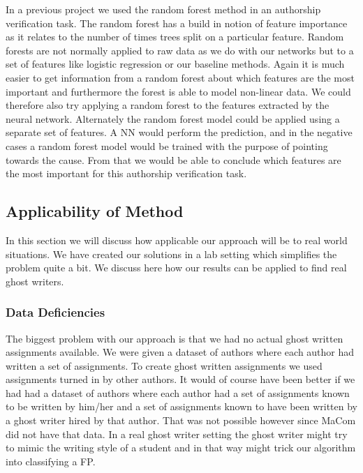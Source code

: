 In a previous project \citep{US} we used the random forest method in an
authorship verification task. The random forest has a build in notion of feature
importance as it relates to the number of times trees split on a particular
feature. Random forests are not normally applied to raw data as we do with our
networks but to a set of features like logistic regression or our baseline
methods. Again it is much easier to get information from a random forest about
which features are the most important and furthermore the forest is able to
model non-linear data. We could therefore also try applying a random forest to
the features extracted by the neural network. Alternately the random forest
model could be applied using a separate set of features. A \gls{NN} would
perform the prediction, and in the negative cases a random forest model would
be trained with the purpose of pointing towards the cause. From that we would
be able to conclude which features are the most important for this authorship
verification task.


\subsection{Applicability of Method}\label{subsec:applicability_of_method}

In this section we will discuss how applicable our approach will be to real
world situations. We have created our solutions in a lab setting which
simplifies the problem quite a bit. We discuss here how our results can be
applied to find real ghost writers.


\subsubsection{Data Deficiencies}

The biggest problem with our approach is that we had no actual ghost written
assignments available. We were given a dataset of authors where each author
had written a set of assignments. To create ghost written assignments we used
assignments turned in by other authors. It would of course have been better if
we had had a dataset of authors where each author had a set of assignments known
to be written by him/her and a set of assignments known to have been written by
a ghost writer hired by that author. That was not possible however since MaCom
did not have that data. In a real ghost writer setting the ghost writer might
try to mimic the writing style of a student and in that way might trick our
algorithm into classifying a \gls{FP}.

